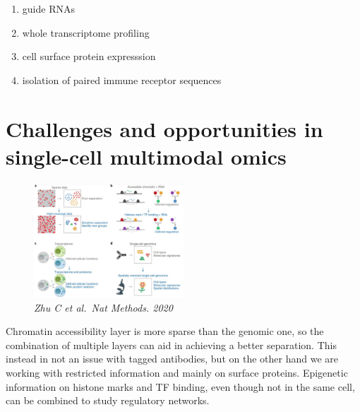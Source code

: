 \begin{enumerate}
\def\labelenumi{\arabic{enumi}.}
\tightlist
\item
  guide RNAs
\item
  whole transcriptome profiling
\item
  cell surface protein expresssion
\item
  isolation of paired immune receptor sequences
\end{enumerate}

\hypertarget{challenges-and-opportunities-in-single-cell-multimodal-omics}{%
\section{Challenges and opportunities in single-cell multimodal
omics}\label{challenges-and-opportunities-in-single-cell-multimodal-omics}}

\begin{figure}
\centering
\includegraphics[width=0.5\textwidth]{images/Screenshot_14.png}
\caption{\emph{Zhu C et al.~Nat Methods. 2020}}
\end{figure}


Chromatin accessibility layer is more sparse than the genomic one, so
the combination of multiple layers can aid in achieving a better
separation. This instead in not an issue with tagged antibodies, but on
the other hand we are working with restricted information and mainly on
surface proteins. Epigenetic information on histone marks and TF
binding, even though not in the same cell, can be combined to study
regulatory networks.
